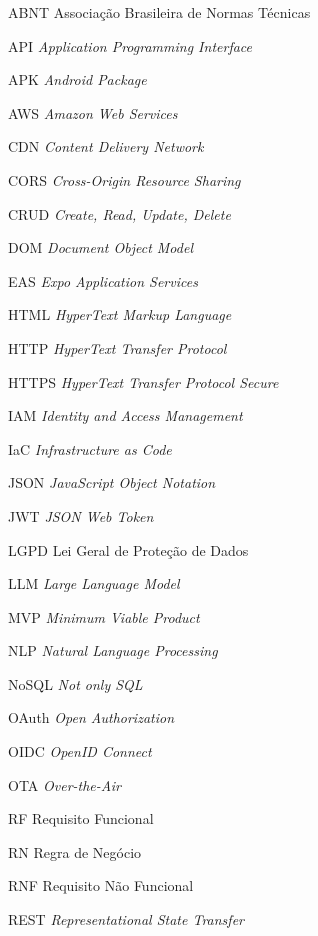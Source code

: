 
\begin{siglas}
  \item[ABNT] Associação Brasileira de Normas Técnicas
  \item[API] \textit{Application Programming Interface}
  \item[APK] \textit{Android Package}
  \item[AWS] \textit{Amazon Web Services}
  \item[CDN] \textit{Content Delivery Network}
  \item[CORS] \textit{Cross-Origin Resource Sharing}
  \item[CRUD] \textit{Create, Read, Update, Delete}
  \item[DOM] \textit{Document Object Model}
  \item[EAS] \textit{Expo Application Services}
  \item[HTML] \textit{HyperText Markup Language}
  \item[HTTP] \textit{HyperText Transfer Protocol}
  \item[HTTPS] \textit{HyperText Transfer Protocol Secure}
  \item[IAM] \textit{Identity and Access Management}
  \item[IaC] \textit{Infrastructure as Code}
  \item[JSON] \textit{JavaScript Object Notation}
  \item[JWT] \textit{JSON Web Token}
  \item[LGPD] Lei Geral de Proteção de Dados
  \item[LLM] \textit{Large Language Model}
  \item[MVP] \textit{Minimum Viable Product}
  \item[NLP] \textit{Natural Language Processing}
  \item[NoSQL] \textit{Not only SQL}
  \item[OAuth] \textit{Open Authorization}
  \item[OIDC] \textit{OpenID Connect}
  \item[OTA] \textit{Over-the-Air}
  \item[RF] Requisito Funcional
  \item[RN] Regra de Negócio
  \item[RNF] Requisito Não Funcional
  \item[REST] \textit{Representational State Transfer}

\end{siglas}
